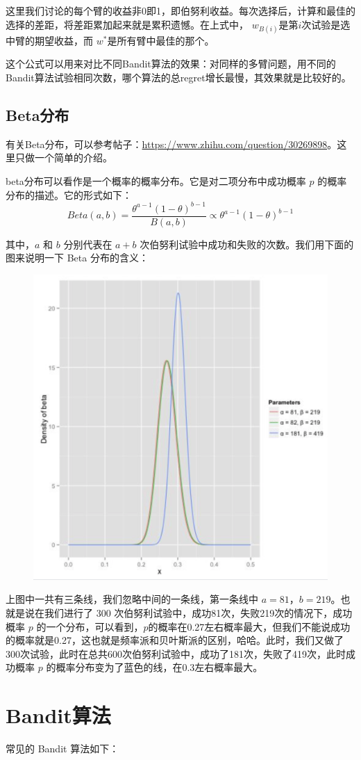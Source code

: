 \documentclass[12pt]{article}
\begin{document}
这里我们讨论的每个臂的收益非0即1，即伯努利收益。每次选择后，计算和最佳的选择的差距，将差距累加起来就是累积遗憾。在上式中， $w_{B(i)}$是第$i$次试验是选中臂的期望收益，而 $w^*$是所有臂中最佳的那个。

这个公式可以用来对比不同Bandit算法的效果：对同样的多臂问题，用不同的Bandit算法试验相同次数，哪个算法的总regret增长最慢，其效果就是比较好的。

\subsection{Beta分布}
有关Beta分布，可以参考帖子：\url{https://www.zhihu.com/question/30269898}。这里只做一个简单的介绍。

beta分布可以看作是一个概率的概率分布。它是对二项分布中成功概率 $p$ 的概率分布的描述。它的形式如下：
$$
Beta(a,b) = \frac{\theta^{a-1}(1-\theta)^{b-1}}{B(a,b)} \propto \theta^{a-1}(1-\theta)^{b-1}
$$

其中，$a$ 和 $b$ 分别代表在 $a+b$ 次伯努利试验中成功和失败的次数。我们用下面的图来说明一下 Beta 分布的含义：
\begin{figure}[H]
    \centering
    \includegraphics[width=.6\textwidth]{fig/Beta_Example.png}
\end{figure}
上图中一共有三条线，我们忽略中间的一条线，第一条线中 $a=81$，$b=219$。也就是说在我们进行了 300 次伯努利试验中，成功81次，失败219次的情况下，成功概率 $p$ 的一个分布，可以看到，$p$的概率在0.27左右概率最大，但我们不能说成功的概率就是0.27，这也就是频率派和贝叶斯派的区别，哈哈。此时，我们又做了300次试验，此时在总共600次伯努利试验中，成功了181次，失败了419次，此时成功概率 $p$ 的概率分布变为了蓝色的线，在0.3左右概率最大。


\section{Bandit算法}
常见的 Bandit 算法如下：
\end{document}
